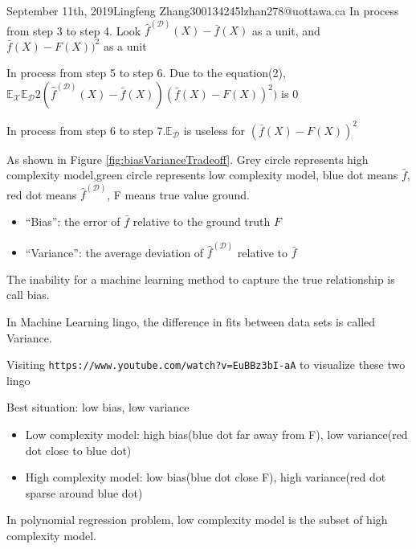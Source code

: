 \documentclass{article}
\begin{document}
\begin{lecture}{September 11th, 2019}{Lingfeng Zhang}{300134245}{lzhan278@uottawa.ca}
In process from step 3 to step 4. Look $\hat f^{(\mathcal{D})}(X) - \bar f(X)$ as a unit, and $\bar f(X) - F(X))^2$ as a unit

In process from step 5 to step 6. Due to the equation(2), $\mathbb{E} _\mathcal{X} \mathbb{E} _\mathcal{D}2(\hat f^{(\mathcal{D})}(X) - \bar f(X))(\bar f(X) - F(X))^2)$ is 0

In process from step 6 to step 7.$\mathbb{E} _\mathcal{D}$ is useless for $(\bar f(X) - F(X))^2$

As shown in Figure \ref{fig:biasVarianceTradeoff}. Grey circle represents high complexity model,green circle represents low complexity model, blue dot means $\bar f$, red dot means $\hat f^{(\mathcal{D})}$, F means true value ground.

\begin{itemize}
\item “Bias”: the error of $\bar f$ relative to the ground truth $F$ 

\item “Variance”: the average deviation of $\hat f^{(\mathcal{D})}$ relative to $\bar f$
\end{itemize}

The inability for a machine learning method to capture the true relationship is call bias.

In Machine Learning lingo, the difference in fits between data sets is called Variance.

Visiting \texttt{https://www.youtube.com/watch?v=EuBBz3bI-aA} to visualize these two lingo

Best situation: low bias, low variance

\begin{itemize}
\item Low complexity model: high bias(blue dot far away from F), low variance(red dot close to blue dot)

\item High complexity model: low bias(blue dot close F), high variance(red dot sparse around blue dot)
\end{itemize}

In polynomial regression problem, low complexity model is the subset of high complexity model.


\end{lecture}
\end{document}
